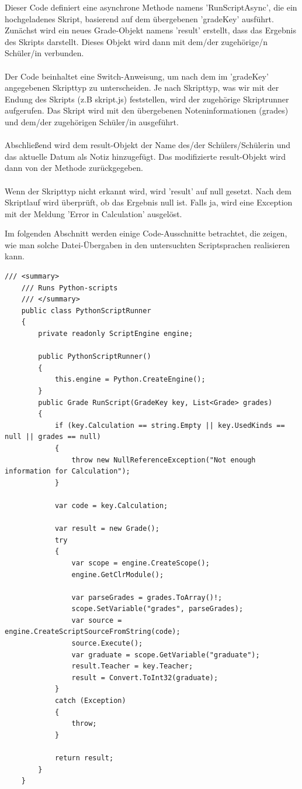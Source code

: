Dieser Code definiert eine asynchrone Methode namens 'RunScriptAsync', die ein hochgeladenes Skript, basierend 
auf dem übergebenen 'gradeKey' ausführt. Zunächst wird ein neues Grade-Objekt namens 'result' erstellt, dass 
das Ergebnis des Skripts darstellt. Dieses Objekt wird dann mit dem/der zugehörige/n Schüler/in verbunden.
\\\\
Der Code beinhaltet eine Switch-Anweisung, um nach dem im 'gradeKey' angegebenen Skripttyp zu unterscheiden. 
Je nach Skripttyp, was wir mit der Endung des Skripts (z.B skript.js) feststellen, wird der zugehörige 
Skriptrunner aufgerufen. Das Skript wird mit den übergebenen Noteninformationen (grades) und dem/der 
zugehörigen Schüler/in ausgeführt.
\\\\
Abschließend wird dem result-Objekt der Name des/der Schülers/Schülerin und das aktuelle Datum als Notiz hinzugefügt. 
Das modifizierte result-Objekt wird dann von der Methode zurückgegeben.
\\\\
Wenn der Skripttyp nicht erkannt wird, wird 'result' auf null gesetzt. Nach dem Skriptlauf wird überprüft, 
ob das Ergebnis null ist. Falls ja, wird eine Exception mit der Meldung 'Error in Calculation' ausgelöst. 

\newpage
{}
Im folgenden Abschnitt  werden einige Code-Ausschnitte betrachtet, die zeigen, wie man solche Datei-Übergaben in den untersuchten Scriptsprachen realisieren kann. 

\begin{lstlisting}[language={[Sharp]C}, caption=Code for IronPython, label=lst:imp:py]
    /// <summary>
    /// Runs Python-scripts
    /// </summary>
    public class PythonScriptRunner
    {
        private readonly ScriptEngine engine;

        public PythonScriptRunner()
        {
            this.engine = Python.CreateEngine();
        }
        public Grade RunScript(GradeKey key, List<Grade> grades)
        {
            if (key.Calculation == string.Empty || key.UsedKinds == null || grades == null)
            {
                throw new NullReferenceException("Not enough information for Calculation");
            }

            var code = key.Calculation;

            var result = new Grade();
            try
            {
                var scope = engine.CreateScope();
                engine.GetClrModule();

                var parseGrades = grades.ToArray()!;
                scope.SetVariable("grades", parseGrades);
                var source = engine.CreateScriptSourceFromString(code);
                source.Execute();
                var graduate = scope.GetVariable("graduate");
                result.Teacher = key.Teacher;
                result = Convert.ToInt32(graduate);
            }
            catch (Exception)
            {
                throw;
            }

            return result;
        }
    }
\end{lstlisting}

